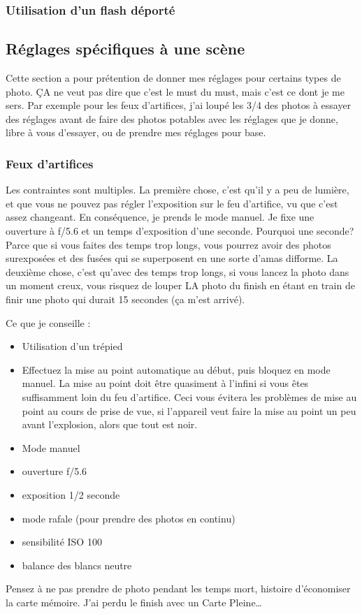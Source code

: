 \documentclass[a4paper,twoside]{article}
\begin{document}
\subsubsection{Utilisation d'un flash déporté}

\subsection{Réglages spécifiques à une scène}
Cette section a pour prétention de donner mes réglages pour certains types de photo. ÇA ne veut pas dire que c'est le must du must, mais c'est ce dont je me sers. Par exemple pour les feux d'artifices, j'ai loupé les 3/4 des photos à essayer des réglages avant de faire des photos potables avec les réglages que je donne, libre à vous d'essayer, ou de prendre mes réglages pour base. 

\subsubsection{Feux d'artifices}
Les contraintes sont multiples. La première chose, c'est qu'il y a peu de lumière, et que vous ne pouvez pas régler l'exposition sur le feu d'artifice, vu que c'est assez changeant. En conséquence, je prends le mode manuel. Je fixe une ouverture à f/5.6 et un temps d'exposition d'une seconde. Pourquoi une seconde? Parce que si vous faites des temps trop longs, vous pourrez avoir des photos surexposées et des fusées qui se superposent en une sorte d'amas difforme. La deuxième chose, c'est qu'avec des temps trop longs, si vous lancez la photo dans un moment creux, vous risquez de louper LA photo du finish en étant en train de finir une photo qui durait 15 secondes (ça m'est arrivé). 

Ce que je conseille : 
\begin{itemize}
\item Utilisation d'un trépied
\item Effectuez la mise au point automatique au début, puis bloquez en mode manuel. La mise au point doit être quasiment à l'infini si vous êtes suffisamment loin du feu d'artifice. Ceci vous évitera les problèmes de mise au point au cours de prise de vue, si l'appareil veut faire la mise au point un peu avant l'explosion, alors que tout est noir.
\item Mode manuel
\item ouverture f/5.6
\item exposition 1/2 seconde
\item mode rafale (pour prendre des photos en continu)
\item sensibilité ISO 100
\item balance des blancs neutre
\end{itemize}

\begin{remarque}
Pensez à ne pas prendre de photo pendant les temps mort, histoire d'économiser la carte mémoire. J'ai perdu le finish avec un \og Carte Pleine\fg\dots
\end{remarque}


\printindex
\end{document}
